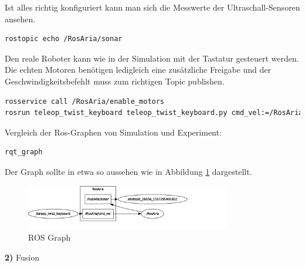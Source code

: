 \documentclass[a4paper,10pt]{article}
\begin{document}
\bigskip
Ist alles richtig konfiguriert kann man sich die Messwerte der Ultraschall-Sensoren ansehen.
\begin{lstlisting}[language=xml, basicstyle=\small]
rostopic echo /RosAria/sonar
\end{lstlisting}

\bigskip
Den reale Roboter kann wie in der Simulation mit der Tastatur gesteuert werden.
Die echten Motoren benötigen ledigleich eine zusätzliche Freigabe und der Geschwindigkeitsbefehlt muss zum richtigen Topic publishen. 
\begin{lstlisting}[language=xml, basicstyle=\small]
rosservice call /RosAria/enable_motors
rosrun teleop_twist_keyboard teleop_twist_keyboard.py cmd_vel:=/RosAria/cmd_vel
\end{lstlisting}


\bigskip
Vergleich der Ros-Graphen von Simulation und Experiment:
\begin{lstlisting}[language=xml, basicstyle=\small]
rqt_graph
\end{lstlisting}

Der Graph sollte in etwa so aussehen wie in Abbildung \ref{rosgraph} dargestellt.

\begin{figure}[htbp]
	\centering
	\includegraphics[width=0.8\textwidth]{rosgraph.jpg}
	\caption{ROS Graph}
	\label{rosgraph}
\end{figure}



\newpage

\Large \textbf{2)} Fusion \hfill \\ \normalsize
\end{document}
